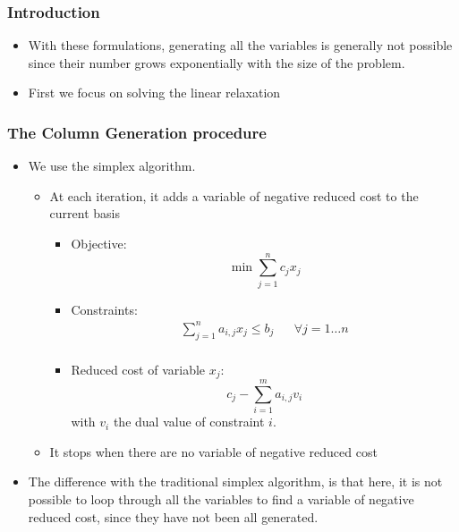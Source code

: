 \documentclass[10pt]{beamer}
\begin{document}
\begin{frame}
  \frametitle{Introduction}
  
  \begin{itemize}
    \item With these formulations, generating all the variables is generally not possible since their number grows exponentially with the size of the problem.
    \item First we focus on solving the \alert{linear relaxation}
  \end{itemize}
\end{frame}

\begin{frame}
  \frametitle{The Column Generation procedure}
  
  \begin{itemize}
    \item We use the \alert{simplex algorithm}.
      \begin{itemize}
        \item At each iteration, it adds a variable of negative reduced cost to the current basis
        \begin{itemize}
          \item Objective:
            \begin{displaymath}
              \min \sum_{j = 1}^n c_j x_j
            \end{displaymath}
          \item Constraints:
          \begin{align*}
            \sum_{j = 1}^n a_{i, j} x_j \le b_j && \forall j = 1 \dots n \\
          \end{align*}
          \item Reduced cost of variable $x_j$:
            \begin{displaymath}
              c_j - \sum_{i = 1}^m a_{i, j} v_i
            \end{displaymath}
            with $v_i$ the dual value of constraint $i$.
        \end{itemize}
        \item It stops when there are no variable of negative reduced cost
      \end{itemize}
    \item The difference with the traditional simplex algorithm, is that here, it is not possible to loop through all the variables to find a variable of negative reduced cost, since they have not been all generated.
  \end{itemize}
\end{frame}
\end{document}
